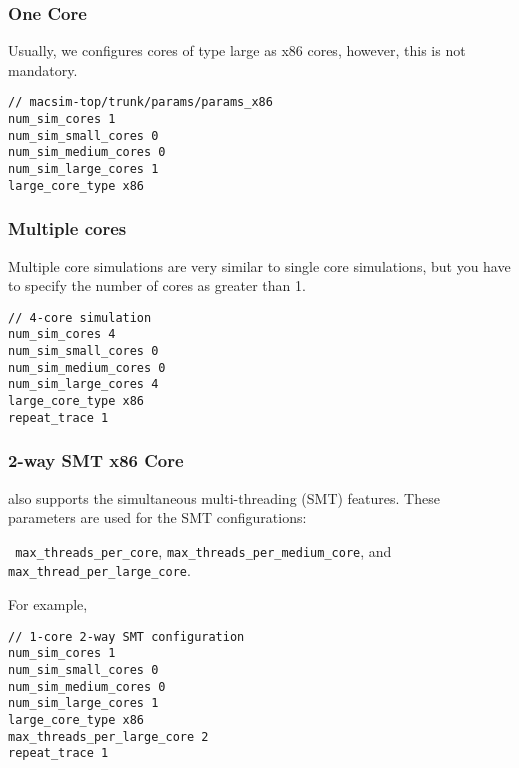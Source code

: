 \subsubsection{One \cpu Core}

Usually, we configures cores of type large as x86 cores, however, this is not
mandatory.

\begin{Verbatim}
// macsim-top/trunk/params/params_x86
num_sim_cores 1
num_sim_small_cores 0
num_sim_medium_cores 0
num_sim_large_cores 1
large_core_type x86
\end{Verbatim}


\subsubsection{Multiple \cpu cores}

Multiple core simulations are very similar to single core simulations, but you
have to specify the number of cores as greater than 1.


\begin{Verbatim}
// 4-core simulation
num_sim_cores 4
num_sim_small_cores 0
num_sim_medium_cores 0
num_sim_large_cores 4
large_core_type x86
repeat_trace 1
\end{Verbatim}



\subsubsection{2-way SMT x86 Core}

\SIM also supports the simultaneous multi-threading (SMT) features.
These parameters are used for the SMT configurations:

\Verb+ max_threads_per_core+, \Verb+max_threads_per_medium_core+, and
\Verb+max_thread_per_large_core+. 

\noindent
For example,

\begin{Verbatim}
// 1-core 2-way SMT configuration
num_sim_cores 1
num_sim_small_cores 0
num_sim_medium_cores 0
num_sim_large_cores 1
large_core_type x86
max_threads_per_large_core 2
repeat_trace 1
\end{Verbatim}



